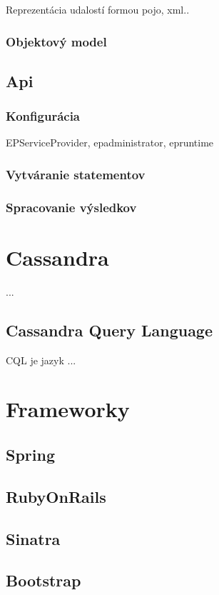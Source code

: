 		Reprezentácia udalostí formou pojo, xml..
		\subsubsection{Objektový model}	

	\subsection{Api}
		\subsubsection{Konfigurácia}
		EPServiceProvider, epadministrator, epruntime
		
		\subsubsection{Vytváranie statementov}
		\subsubsection{Spracovanie výsledkov}

\section{Cassandra}
	...
	\subsection{Cassandra Query Language}
	\ac{CQL} je jazyk ...
	
\section{Frameworky}
	\subsection{Spring}
	\subsection{RubyOnRails}
	\subsection{Sinatra}
	\subsection{Bootstrap}
